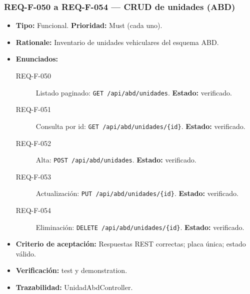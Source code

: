 \documentclass[12pt,a4paper]{article}
\begin{document}
\subsubsection{REQ-F-050 a REQ-F-054 --- CRUD de unidades (ABD)}
\begin{itemize}
  \item \textbf{Tipo:} Funcional. \textbf{Prioridad:} Must (cada uno).
  \item \textbf{Rationale:} Inventario de unidades vehiculares del esquema ABD.
  \item \textbf{Enunciados:}
    \begin{description}
      \item[REQ-F-050] Listado paginado: \texttt{GET /api/abd/unidades}. \textbf{Estado:} verificado.
      \item[REQ-F-051] Consulta por id: \texttt{GET /api/abd/unidades/\{id\}}. \textbf{Estado:} verificado.
      \item[REQ-F-052] Alta: \texttt{POST /api/abd/unidades}. \textbf{Estado:} verificado.
      \item[REQ-F-053] Actualización: \texttt{PUT /api/abd/unidades/\{id\}}. \textbf{Estado:} verificado.
      \item[REQ-F-054] Eliminación: \texttt{DELETE /api/abd/unidades/\{id\}}. \textbf{Estado:} verificado.
    \end{description}
  \item \textbf{Criterio de aceptación:} Respuestas REST correctas; placa única; estado válido.
  \item \textbf{Verificación:} test y demonstration.
  \item \textbf{Trazabilidad:} UnidadAbdController.
\end{itemize}
\end{document}
